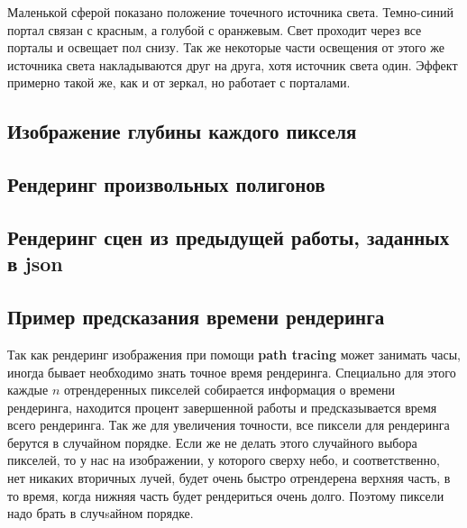 Маленькой сферой показано положение точечного источника света. Темно-синий портал связан с красным, а голубой с оранжевым. Свет проходит через все порталы и освещает пол снизу. Так же некоторые части освещения от этого же источника света накладываются друг на друга, хотя источник света один. Эффект примерно такой же, как и от зеркал, но работает с порталами.



\subsection{Изображение глубины каждого пикселя}


\subsection{Рендеринг произвольных полигонов}


\subsection{Рендеринг сцен из предыдущей работы, заданных в json}



\subsection{Пример предсказания времени рендеринга}

Так как рендеринг изображения при помощи \textbf{path tracing} может занимать часы, иногда бывает необходимо знать точное время рендеринга. Специально для этого каждые $n$ отрендеренных пикселей собирается информация о времени рендеринга, находится процент завершенной работы и предсказывается время всего рендеринга. Так же для увеличения точности, все пиксели для рендеринга берутся в случайном порядке. Если же не делать этого случайного выбора пикселей, то у нас на изображении, у которого сверху небо, и соответственно, нет никаких вторичных лучей, будет очень быстро отрендерена верхняя часть, в то время, когда нижняя часть будет рендериться очень долго. Поэтому пиксели надо брать в случsайном порядке.

